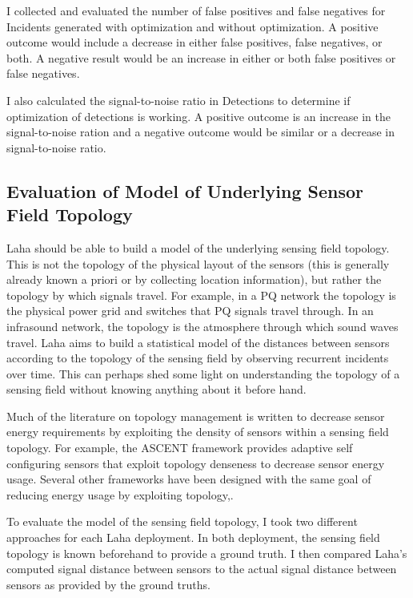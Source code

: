 I collected and evaluated the number of false positives and false negatives for Incidents generated with optimization and without optimization. A positive outcome would include a decrease in either false positives, false negatives, or both. A negative result would be an increase in either or both false positives or false negatives.

I also calculated the signal-to-noise ratio in Detections to determine if optimization of detections is working. A positive outcome is an increase in the signal-to-noise ration and a negative outcome would be similar or a decrease in signal-to-noise ratio.

\subsection{Evaluation of Model of Underlying Sensor Field Topology}
Laha should be able to build a model of the underlying sensing field topology. This is not the topology of the physical layout of the sensors (this is generally already known a priori or by collecting location information), but rather the topology by which signals travel. For example, in a PQ network the topology is the physical power grid and switches that PQ signals travel through. In an infrasound network, the topology is the atmosphere through which sound waves travel. Laha aims to build a statistical model of the distances between sensors according to the topology of the sensing field by observing recurrent incidents over time. This can perhaps shed some light on understanding the topology of a sensing field without knowing anything about it before hand.

Much of the literature on topology management is written to decrease sensor energy requirements by exploiting the density of sensors within a sensing field topology. For example, the ASCENT\cite{cerpa2004ascent} framework provides adaptive self configuring sensors that exploit topology denseness to decrease sensor energy usage. Several other frameworks have been designed with the same goal of reducing energy usage by exploiting topology\cite{schurgers2002stem},\cite{schurgers2002topology}.

To evaluate the model of the sensing field topology, I took two different approaches for each Laha deployment. In both deployment, the sensing field topology is known beforehand to provide a ground truth. I then compared Laha's computed signal distance between sensors to the actual signal distance between sensors as provided by the ground truths.

